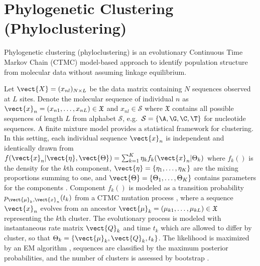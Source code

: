 \section[Phylogenetic Clustering (Phyloclustering)]{Phylogenetic Clustering (Phyloclustering)}
\label{sec:phyloclustering}

Phylogenetic clustering (phyloclustering) is an evolutionary
Continuous Time Markov Chain (CTMC) model-based approach to identify population
structure from molecular data without assuming linkage equilibrium.

Let $\vect{X} = (x_{nl})_{N\times L}$ be the data matrix containing
$N$ sequences observed at $L$ sites. Denote the molecular sequence
of individual $n$ as
$\vect{x}_n = (x_{n1}, \ldots, x_{nL}) \in \mathfrak{X}$ and
$x_{nl} \in \mathcal{S}$ where
$\mathfrak{X}$ contains all possible sequences of length $L$ from alphabet
$\mathcal{S}$, e.g.\ $\mathcal{S} = \{\A, \G, \C, \T\}$
for nucleotide sequences.
A finite mixture model provides a statistical framework for clustering.
In this setting, each individual sequence $\vect{x}_n$ is independent
and identically drawn from
$
f(\vect{x}_n | \vect{\eta}, \vect{\Theta}) =
\sum_{k = 1}^K \eta_k f_k(\vect{x}_n | \Theta_k)
$
where $f_k()$ is the density for the $k$th component,
$\vect{\eta} = \{\eta_1, \ldots, \eta_K\}$ are the mixing proportions
summing to one, and
$\vect{\Theta} = \{\Theta_1,\ldots,\Theta_K\}$ contains parameters for the
components \citep{Fraley2002}.
Component $f_k()$ is modeled as a transition probability
$p_{\vect{\mu}_k,\vect{x}_n}(t_k)$ from a CTMC mutation
process \citep{Felsenstein2004}, where
a sequence $\vect{x}_n$ evolves from
an ancestor
$\vect{\mu}_k = (\mu_{k1}, \ldots, \mu_{kL}) \in \mathfrak{X}$
representing the $k$th cluster.
The evolutionary process is modeled with instantaneous rate matrix
$\vect{Q}_k$ and time $t_k$
which are allowed to differ by cluster, so that
$\Theta_k = \{\vect{\mu}_k, \vect{Q}_k, t_k\}$.
The likelihood is maximized by an EM algorithm \citep{Dempster1977},
sequences are classified
by the maximum posterior probabilities, and the number of clusters is
assessed by bootstrap \citep{Maitra2010}.

